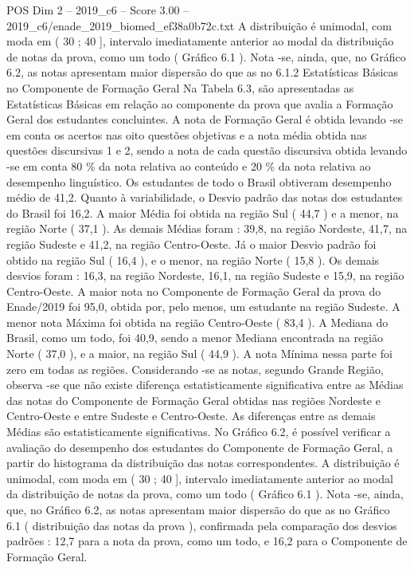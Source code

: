 \begin{textsample}{POS Dim 2 – 2019\_c6 – Score 3.00 – 2019\_c6/enade\_2019\_biomed\_ef38a0b72c.txt}
A distribuição é unimodal, com moda em ( 30 ; 40 ], intervalo imediatamente anterior ao modal da distribuição de notas da prova, como um todo ( Gráfico 6.1 ).
Nota -se, ainda, que, no Gráfico 6.2, as notas apresentam maior dispersão do que as no 6.1.2 Estatísticas Básicas no Componente de Formação Geral Na Tabela 6.3, são apresentadas as Estatísticas Básicas em relação ao componente da prova que avalia a Formação Geral dos estudantes concluintes.
A nota de Formação Geral é obtida levando -se em conta os acertos nas oito questões objetivas e a nota média obtida nas questões discursivas 1 e 2, sendo a nota de cada questão discursiva obtida levando -se em conta 80 \% da nota relativa ao conteúdo e 20 \% da nota relativa ao desempenho linguístico.
Os estudantes de todo o Brasil obtiveram desempenho médio de 41,2.
Quanto à variabilidade, o Desvio padrão das notas dos estudantes do Brasil foi 16,2.
A maior Média foi obtida na região Sul ( 44,7 ) e a menor, na região Norte ( 37,1 ).
As demais Médias foram : 39,8, na região Nordeste, 41,7, na região Sudeste e 41,2, na região Centro-Oeste.
Já o maior Desvio padrão foi obtido na região Sul ( 16,4 ), e o menor, na região Norte ( 15,8 ).
Os demais desvios foram : 16,3, na região Nordeste, 16,1, na região Sudeste e 15,9, na região Centro-Oeste.
A maior nota no Componente de Formação Geral da prova do Enade/2019 foi 95,0, obtida por, pelo menos, um estudante na região Sudeste.
A menor nota Máxima foi obtida na região Centro-Oeste ( 83,4 ).
A Mediana do Brasil, como um todo, foi 40,9, sendo a menor Mediana encontrada na região Norte ( 37,0 ), e a maior, na região Sul ( 44,9 ).
A nota Mínima nessa parte foi zero em todas as regiões.
Considerando -se as notas, segundo Grande Região, observa -se que não existe diferença estatisticamente significativa entre as Médias das notas do Componente de Formação Geral obtidas nas regiões Nordeste e Centro-Oeste e entre Sudeste e Centro-Oeste.
As diferenças entre as demais Médias são estatisticamente significativas.
No Gráfico 6.2, é possível verificar a avaliação do desempenho dos estudantes do Componente de Formação Geral, a partir do histograma da distribuição das notas correspondentes.
A distribuição é unimodal, com moda em ( 30 ; 40 ], intervalo imediatamente anterior ao modal da distribuição de notas da prova, como um todo ( Gráfico 6.1 ).
Nota -se, ainda, que, no Gráfico 6.2, as notas apresentam maior dispersão do que as no Gráfico 6.1 ( distribuição das notas da prova ), confirmada pela comparação dos desvios padrões : 12,7 para a nota da prova, como um todo, e 16,2 para o Componente de Formação Geral.

\end{textsample}
